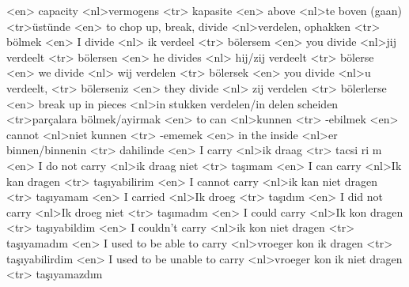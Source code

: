 <en> capacity 
<nl>vermogens 
<tr> kapasite 
<en> above 
<nl>te boven (gaan) 
<tr>üstünde 
<en> to chop up, break, divide 
<nl>verdelen,  ophakken 
<tr> bölmek 
<en> I divide 
<nl> ik verdeel  
<tr> bölersem  
<en> you divide 
<nl>jij verdeelt  
<tr> bölersen  
<en> he divides 
<nl> hij/zij verdeelt 
<tr> bölerse
<en> we divide 
<nl> wij verdelen 
<tr> bölersek
<en> you divide 
<nl>u verdeelt,  
<tr> bölerseniz 
<en> they divide 
<nl> zij verdelen 
<tr> bölerlerse  
<en> break up in pieces 
<nl>in stukken verdelen/in delen scheiden  
<tr>parçalara bölmek/ayirmak  
<en> to can 
<nl>kunnen 
<tr> -ebilmek
<en> cannot 
<nl>niet kunnen 
<tr> -ememek  
<en> in the inside 
<nl>er binnen/binnenin 
<tr> dahilinde 
<en> I carry 
<nl>ik draag 
<tr> tac{s}i ri m
<en> I do not carry 
<nl>ik draag niet 
<tr> taşımam 
<en> I can carry 
<nl>Ik kan dragen 
<tr> taşıyabilirim 
<en> I cannot carry 
<nl>ik kan niet dragen 
<tr> taşıyamam 
<en> I carried 
<nl>Ik droeg 
<tr> taşıdım
<en> I did not  carry 
<nl>Ik droeg niet 
<tr> taşımadım 
<en> I could carry 
<nl>Ik kon dragen 
<tr> taşıyabildim 
<en> I couldn't carry 
<nl>ik kon niet dragen 
<tr> taşıyamadım  
<en> I used to be  able to carry 
<nl>vroeger kon ik dragen 
<tr> taşıyabilirdim 
<en> I used to be unable to carry 
<nl>vroeger kon ik niet dragen 
<tr> taşıyamazdım 
